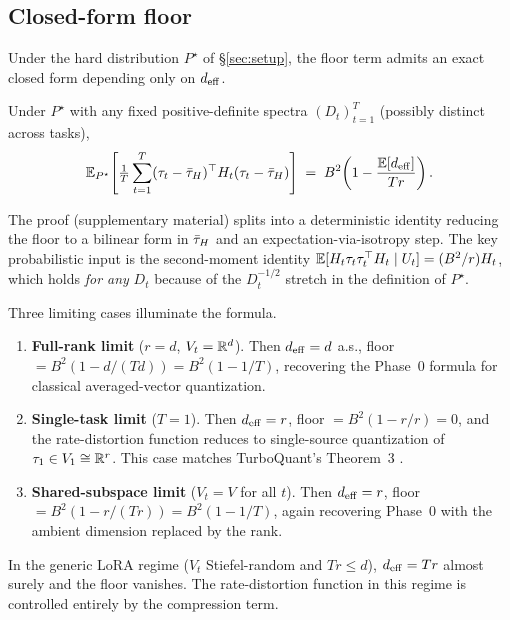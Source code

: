 \subsection{Closed-form floor}\label{subsec:floor}

Under the hard distribution $P^\star$ of \S\ref{sec:setup}, the
floor term admits an exact closed form depending only on
$d_{\mathrm{eff}}$.

\begin{lemma}\label{lem:floor-general}
Under $P^\star$ with any fixed positive-definite spectra
$(D_t)_{t=1}^T$ (possibly distinct across tasks),
\begin{equation}\label{eq:floor-closed}
  \mathbb{E}_{P^\star}\!\left[\tfrac1T\sum_{t=1}^T(\tau_t-\bar{\tau}_H)^\top
   H_t(\tau_t-\bar{\tau}_H)\right]
  \;=\; B^2\!\left(1 - \frac{\mathbb{E}[d_{\mathrm{eff}}]}{Tr}\right).
\end{equation}
\end{lemma}

The proof (supplementary material) splits into a deterministic
identity reducing the floor to a bilinear form in $\bar{\tau}_H$ and an
expectation-via-isotropy step. The key probabilistic input is
the second-moment identity $\mathbb{E}[H_t\tau_t\tau_t^\top H_t\mid U_t]
= (B^2/r) H_t$, which holds \emph{for any} $D_t$ because of the
$D_t^{-1/2}$ stretch in the definition of $P^\star$.

Three limiting cases illuminate the formula.

\begin{enumerate}[leftmargin=*,topsep=2pt,itemsep=2pt]
  \item \textbf{Full-rank limit} ($r = d$, $V_t = \mathbb{R}^d$). Then
  $d_{\mathrm{eff}} = d$ a.s., floor $= B^2(1 - d/(Td)) = B^2(1 - 1/T)$,
  recovering the Phase~0 formula for classical averaged-vector
  quantization.
  \item \textbf{Single-task limit} ($T = 1$). Then $d_{\mathrm{eff}} = r$,
  floor $= B^2(1 - r/r) = 0$, and the rate-distortion function
  reduces to single-source quantization of $\tau_1\in V_1\cong
  \mathbb{R}^r$. This case matches TurboQuant's Theorem~3
  \cite{zandieh2025turboquant}.
  \item \textbf{Shared-subspace limit} ($V_t = V$ for all $t$).
  Then $d_{\mathrm{eff}} = r$, floor $= B^2(1 - r/(Tr)) = B^2(1-1/T)$, again
  recovering Phase~0 with the ambient dimension replaced by the
  rank.
\end{enumerate}
In the generic LoRA regime ($V_t$ Stiefel-random and $Tr\leq d$),
$d_{\mathrm{eff}} = Tr$ almost surely and the floor vanishes. The
rate-distortion function in this regime is controlled entirely by
the compression term.

